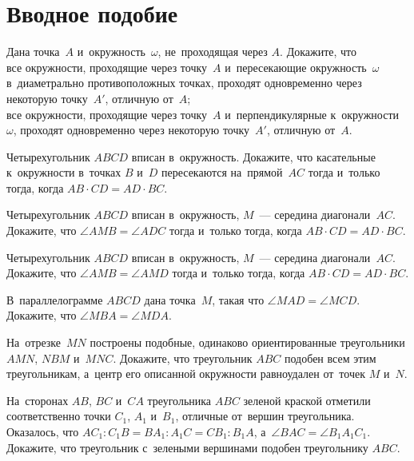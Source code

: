 
\section*{Вводное подобие}


\begin{problems}

\item
Дана точка~$A$ и~окружность~$\omega$, не~проходящая через $A$.
Докажите, что
\\
\subproblem
все окружности, проходящие через точку~$A$ и~пересекающие окружность~$\omega$
в~диаметрально противоположных точках, проходят одновременно через некоторую
точку~$A'$, отличную от~$A$;
\\
\subproblem
все окружности, проходящие через точку~$A$ и~перпендикулярные
к~окружности~$\omega$, проходят одновременно через некоторую точку~$A'$,
отличную от~$A$.

\item
Четырехугольник $ABCD$ вписан в~окружность.
Докажите, что касательные к~окружности в~точках $B$ и~$D$ пересекаются
на~прямой~$AC$ тогда и~только тогда, когда $AB \cdot CD = AD \cdot BC$.

\item
Четырехугольник $ABCD$ вписан в~окружность, $M$~--- середина диагонали~$AC$.
Докажите, что $\angle AMB = \angle ADC$ тогда и~только тогда, когда
$AB \cdot CD = AD \cdot BC$.

\item
Четырехугольник $ABCD$ вписан в~окружность, $M$~--- середина диагонали~$AC$.
Докажите, что $\angle AMB = \angle AMD$ тогда и~только тогда, когда
$AB \cdot CD = AD \cdot BC$.

\item
В~параллелограмме $ABCD$ дана точка~$M$, такая что $\angle MAD = \angle MCD$.
Докажите, что $\angle MBA = \angle MDA$.

\item
На~отрезке~$MN$ построены подобные, одинаково ориентированные треугольники
$AMN$, $NBM$ и~$MNC$.
Докажите, что треугольник $ABC$ подобен всем этим треугольникам, а~центр его
описанной окружности равноудален от~точек $M$ и~$N$.

\item
На~сторонах $AB$, $BC$ и~$CA$ треугольника $ABC$ зеленой краской отметили
соответственно точки $C_1$, $A_1$ и~$B_1$, отличные от~вершин треугольника.
Оказалось, что
\(
    A C_1 : C_1 B
=
    B A_1 : A_1 C
=
    C B_1 : B_1 A
\),
а~$\angle BAC = \angle B_1 A_1 C_1$.
Докажите, что треугольник с~зелеными вершинами подобен треугольнику $ABC$.


\end{problems}
